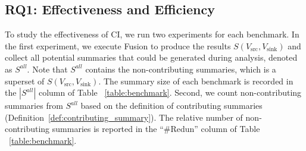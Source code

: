 


\subsection{RQ1: Effectiveness and Efficiency}

To study the effectiveness of CI, we run two experiments for each benchmark.
In the first experiment, we execute Fusion to produce the results $S(V_{\text{src}}, V_{\text{sink}})$ and collect all potential summaries that could be generated during analysis, denoted as $S^{all}$.
Note that $S^{all}$ contains the non-contributing summaries, which is a superset of $S(V_{\text{src}}, V_{\text{sink}})$.  
The summary size of each benchmark is recorded in the $|S^{all}|$ column of Table ~\ref{table:benchmark}.
Second, we count non-contributing summaries from $S^{all}$ based on the definition of contributing summaries (Definition~\ref{def:contributing_summary}). 
The relative number of non-contributing summaries is reported in the ``\#Redun'' column of Table ~\ref{table:benchmark}.



